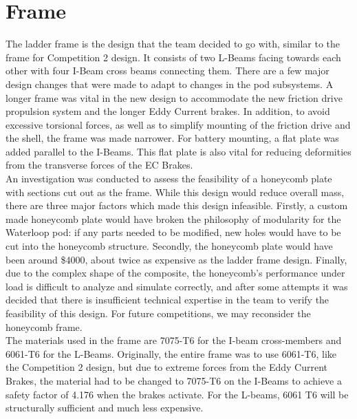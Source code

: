 \documentclass[main.tex]{subfiles}
\begin{document}
    \section{Frame}
   	 The ladder frame is the design that the team decided to go with, similar to the frame for Competition 2 design. It consists of two L-Beams facing towards each other with four I-Beam cross beams connecting them. There are a few major design changes that were made to adapt to changes in the pod subsystems. A longer frame was vital in the new design to accommodate the new friction drive propulsion system and the longer Eddy Current brakes. In addition, to avoid excessive torsional forces, as well as to simplify mounting of the friction drive and the shell, the frame was made narrower. For battery mounting, a flat plate was added parallel to the I-Beams. This flat plate is also vital for reducing deformities from the transverse forces of the EC Brakes.\\

    An investigation was conducted to assess the feasibility of  a honeycomb plate with sections cut out as the frame. While this design would reduce overall mass, there are three major factors which made this design infeasible. Firstly, a custom made honeycomb plate would have broken the philosophy of modularity for the Waterloop pod: if any parts needed to be modified, new holes would have to be cut into the honeycomb structure. Secondly, the honeycomb plate would have been around \$4000, about twice as expensive as the ladder frame design. Finally, due to the complex shape of the  composite, the honeycomb’s performance under load is difficult to analyze and simulate correctly, and after some attempts it was decided that there is insufficient technical expertise in the team to verify the feasibility of this design. For future competitions, we may reconsider the honeycomb frame.\\

    The materials used in the frame are 7075-T6 for the I-beam cross-members and 6061-T6 for the L-Beams. Originally, the entire frame was to use 6061-T6, like the Competition 2 design, but due to extreme forces from the Eddy Current Brakes, the material had to be changed to 7075-T6 on the I-Beams to achieve a safety factor of 4.176 when the brakes activate. For the L-beams, 6061 T6 will be structurally sufficient and much less expensive.
\end{document}
